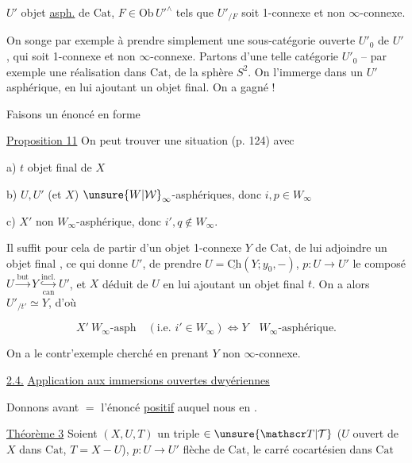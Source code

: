\noindent\makebox[0pt][r]{\rule[-1.8\baselineskip]{0.45pt}{2.6\baselineskip}\hspace{.65em}}%
$U'$ objet \uline{asph.} de $\mathrm{Cat}$, $F\in\mathrm{Ob}\,{U'}^\wedge$ tels que $U'_{/F}$ soit 1-connexe et non $\infty$-connexe.

On songe par exemple à prendre simplement une sous-catégorie ouverte $U'_0$ de $U'$, qui soit 1-connexe et non $\infty$-connexe. Partons d'une telle catégorie $U'_0$ -- par exemple une réalisation  dans $\mathrm{Cat}$, de la sphère $S^2$. On l'immerge  dans un $U'$ asphérique, en lui ajoutant un objet final. On a gagné !

Faisons un énoncé en forme

\uline{Proposition 11} On peut trouver une situation  (p. 124) avec

a) $t$ objet final de $X$

b) $U,U'$ (et $X$) $\unsure{W|\mathcal W}_\infty$-asphériques, donc $i,p\in W_\infty$ 

c) $X'$ non $W_\infty$-asphérique, donc $i',q\notin W_\infty$.

Il suffit pour cela de partir d'un objet 1-connexe  $Y$ de $\mathrm{Cat}$, de lui adjoindre un objet final , ce qui donne $U'$, de prendre $U=\underline{\mathrm{Ch}}(Y;y_0,-)$, $p:U\to U'$ le composé $U\xrightarrow{\mathrm{but}}Y\mathrel{\mathop{\hookrightarrow}\limits^{\mathrm{incl.}}_{\mathrm{can}}}U'$, et $X$  déduit de $U$ en lui ajoutant un objet final $t$. On a alors $U'_{/t'}\simeq Y$,  d'où

\[
 X'\ W_\infty\text{-asph}\quad (\text{i.e. }i'\in W_\infty)\Longleftrightarrow Y\quad W_\infty\text{-asphérique.}
\]

On a le contr'exemple cherché en prenant $Y$  non $\infty$-connexe.

\uline{2.4.} \uline{Application aux immersions ouvertes dwyériennes}

Donnons avant $=$ l'énoncé \uline{positif} auquel nous en .

\uline{Théorème 3} Soient $(X,U,T)$ un triple $\in\unsure{\mathscr T|\mathcal T}$ ($U$ ouvert de $X$ dans $\mathrm{Cat}$, $T=X-U$),  $p:U\longrightarrow U'$  flèche de $\mathrm{Cat}$,  le carré cocartésien dans $\mathrm{Cat}$

